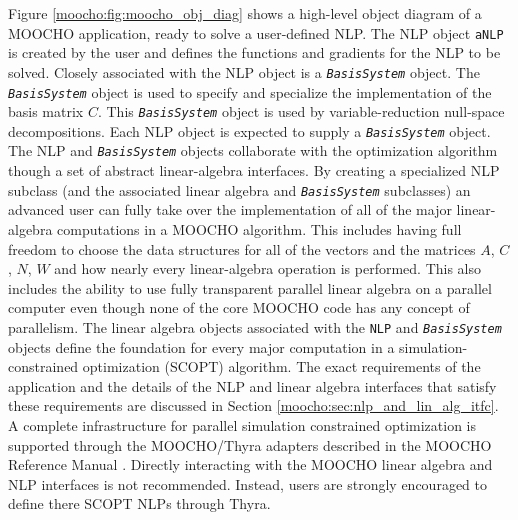 \documentclass[pdf,12pt,report]{SANDreport}
\begin{document}
Figure {}\ref{moocho:fig:moocho_obj_diag} shows a high-level object diagram of
a MOOCHO application, ready to solve a user-defined NLP.  The NLP object
{}\texttt{aNLP} is created by the user and defines the functions and gradients
for the NLP to be solved.  Closely associated with the NLP object is a
{}\texttt{\textit{BasisSystem}} object.  The {}\texttt{\textit{BasisSystem}}
object is used to specify and specialize the implementation of the basis
matrix $C$.  This {}\texttt{\textit{BasisSystem}} object is used by
variable-reduction null-space decompositions.  Each NLP object is expected to
supply a {}\texttt{\textit{BasisSystem}} object.  The NLP and
{}\texttt{\textit{BasisSystem}} objects collaborate with the optimization
algorithm though a set of abstract linear-algebra interfaces.  By creating a
specialized NLP subclass (and the associated linear algebra and
{}\texttt{\textit{BasisSystem}} subclasses) an advanced user can fully take
over the implementation of all of the major linear-algebra computations in a
MOOCHO algorithm.  This includes having full freedom to choose the data
structures for all of the vectors and the matrices $A$, $C$, $N$, $W$ and how
nearly every linear-algebra operation is performed.  This also includes the
ability to use fully transparent parallel linear algebra on a parallel
computer even though none of the core MOOCHO code has any concept of
parallelism.  The linear algebra objects associated with the
{}\texttt{\texttt{NLP}} and {}\texttt{\textit{Basis\-System}} objects define
the foundation for every major computation in a simulation-constrained
optimization (SCOPT) algorithm.  The exact requirements of the application and
the details of the NLP and linear algebra interfaces that satisfy these
requirements are discussed in Section {}\ref{moocho:sec:nlp_and_lin_alg_itfc}.
A complete infrastructure for parallel simulation constrained optimization is
supported through the MOOCHO/Thyra adapters described in the MOOCHO Reference
Manual {}\cite{ref:moochorefguide}.  Directly interacting with the MOOCHO
linear algebra and NLP interfaces is not recommended.  Instead, users are
strongly encouraged to define there SCOPT NLPs through Thyra.
\end{document}
